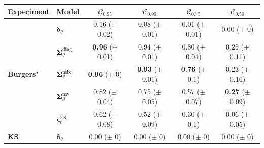  \begin{tabular}{|l|l|cccc|}
    \toprule
        Experiment & Model & $\mathcal{C}_{0.95}$ & $\mathcal{C}_{0.90}$ & $\mathcal{C}_{0.75}$ & $\mathcal{C}_{0.50}$ \\
        \midrule
        \multirow{5}{*}{\textbf{Burgers'}}
        & $\bm\delta_\theta$ & \makecell{0.16 \\ ($\pm$ 0.02)} & \makecell{0.08 \\ ($\pm$ 0.01)} & \makecell{0.01 \\ ($\pm$ 0.01)} & \makecell{0.00 \\ ($\pm$ 0)} \\
        & $\bm\Sigma_\theta^{\mathrm{diag}}$ & \makecell{\textbf{0.96} \\ ($\pm$ 0.01)} & \makecell{0.94 \\ ($\pm$ 0.01)} & \makecell{0.80 \\ ($\pm$ 0.04)} & \makecell{0.25 \\ ($\pm$ 0.11)} \\
        & $\bm\Sigma_\theta^{\mathrm{mix}}$ & \makecell{\textbf{0.96} \\ ($\pm$ 0)} & \makecell{\textbf{0.93} \\ ($\pm$ 0.01)} & \makecell{\textbf{0.76} \\ ($\pm$ 0.1)} & \makecell{0.23 \\ ($\pm$ 0.16)} \\
        & $\bm\Sigma_\theta^{\mathrm{mv}}$ & \makecell{0.82 \\ ($\pm$ 0.04)} & \makecell{0.75 \\ ($\pm$ 0.05)} & \makecell{0.57 \\ ($\pm$ 0.07)} & \makecell{\textbf{0.27} \\ ($\pm$ 0.09)} \\
        & $\bm\epsilon_t^\mathrm{ES}$ & \makecell{0.62 \\ ($\pm$ 0.08)} & \makecell{0.52 \\ ($\pm$ 0.09)} & \makecell{0.30 \\ ($\pm$ 0.1)} & \makecell{0.06 \\ ($\pm$ 0.05)} \\
        \midrule
        \multirow{5}{*}{\textbf{KS}}
        & $\bm\delta_\theta$ & \makecell{0.00 \\ ($\pm$ 0)} & \makecell{0.00 \\ ($\pm$ 0)} & \makecell{0.00 \\ ($\pm$ 0)} & \makecell{0.00 \\ ($\pm$ 0)} \\

\end{tabular}
